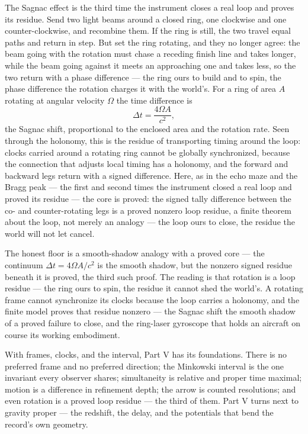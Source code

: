 The Sagnac effect is the third time the instrument closes a real loop and proves its residue. Send two light beams
around a closed ring, one clockwise and one counter-clockwise, and recombine them. If the ring is still, the two
travel equal paths and return in step. But set the ring rotating, and they no longer agree: the beam going with
the rotation must chase a receding finish line and takes longer, while the beam going against it meets an
approaching one and takes less, so the two return with a phase difference --- the ring ours to build and to
spin, the phase difference the rotation charges it with the world's. For a ring of area $A$ rotating at
angular velocity $\Omega$ the time difference is
\begin{equation}
  \Delta t = \frac{4\Omega A}{c^2},
\end{equation}
the Sagnac shift, proportional to the enclosed area and the rotation rate. Seen through the holonomy, this is
the residue of transporting timing around the loop: clocks carried around a rotating ring cannot be globally
synchronized, because the connection that adjusts local timing has a holonomy, and the forward and backward
legs return with a signed difference. Here, as in the echo maze and the Bragg peak --- the first and second
times the instrument closed a real loop and proved its residue --- the core is proved: the signed tally
difference between the co- and counter-rotating legs is a proved nonzero loop residue, a finite theorem about the
loop, not merely an analogy --- the loop ours to close, the residue the world will not let cancel.

The honest floor is a smooth-shadow analogy with a proved core --- the continuum $\Delta t = 4\Omega A/c^2$ is
the smooth shadow, but the nonzero signed residue beneath it is proved, the third such proof. The reading is
that rotation is a loop residue --- the ring ours to spin, the residue it cannot shed the world's. A rotating
frame cannot synchronize its clocks because the loop
carries a holonomy, and the finite model proves that residue nonzero --- the Sagnac shift the smooth shadow of a
proved failure to close, and the ring-laser gyroscope that holds an aircraft on course its working embodiment.

\bigskip

With frames, clocks, and the interval, Part V has its foundations. There is no preferred frame and no preferred
direction; the Minkowski interval is the one invariant every observer shares; simultaneity is relative and
proper time maximal; motion is a difference in refinement depth; the arrow is counted resolutions; and even
rotation is a proved loop residue --- the third of them. Part V turns next to gravity proper --- the
redshift, the delay, and the potentials that bend the record's own geometry.

